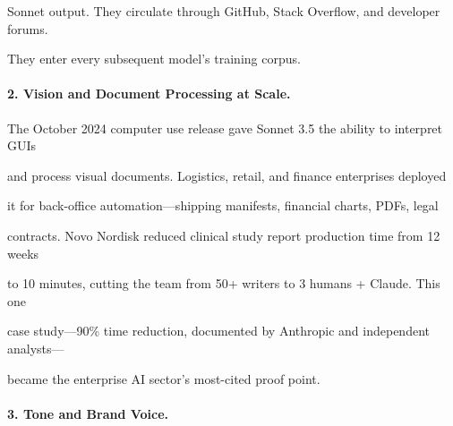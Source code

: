 Sonnet output. They circulate through GitHub, Stack Overflow, and developer forums.





They enter every subsequent model's training corpus.











\paragraph{2. Vision and Document Processing at Scale.}





The October 2024 computer use release gave Sonnet 3.5 the ability to interpret GUIs





and process visual documents. Logistics, retail, and finance enterprises deployed





it for back-office automation---shipping manifests, financial charts, PDFs, legal





contracts. Novo Nordisk reduced clinical study report production time from 12 weeks





to 10 minutes, cutting the team from 50+ writers to 3 humans + Claude. This one





case study---90\% time reduction, documented by Anthropic and independent analysts---





became the enterprise AI sector's most-cited proof point.











\paragraph{3. Tone and Brand Voice.}





